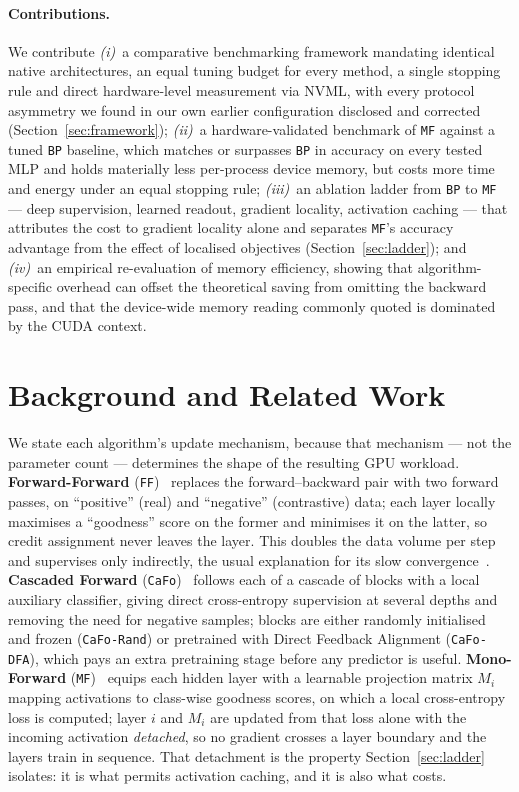 \documentclass{llncs}
\newcommand{\FF}{\texttt{FF}}
\newcommand{\MF}{\texttt{MF}}
\newcommand{\BP}{\texttt{BP}}
\newcommand{\CaFo}{\texttt{CaFo}}
\newcommand{\CaFoRand}{\texttt{CaFo-Rand}}
\newcommand{\CaFoDFA}{\texttt{CaFo-DFA}}
\begin{document}
\paragraph{Contributions.}
We contribute \emph{(i)}~a comparative benchmarking framework mandating
identical native architectures, an equal tuning budget for every method, a
single stopping rule and direct hardware-level measurement via NVML, with
every protocol asymmetry we found in our own earlier configuration disclosed
and corrected (Section~\ref{sec:framework}); \emph{(ii)}~a hardware-validated
benchmark of \MF{} against a tuned \BP{} baseline, which matches or surpasses
\BP{} in accuracy on every tested MLP and holds materially less per-process
device memory, but costs more time and energy under an equal stopping rule;
\emph{(iii)}~an ablation ladder from \BP{} to \MF{} --- deep supervision,
learned readout, gradient locality, activation caching --- that attributes the
cost to gradient locality alone and separates \MF{}'s accuracy advantage from
the effect of localised objectives (Section~\ref{sec:ladder}); and
\emph{(iv)}~an empirical re-evaluation of memory efficiency, showing that
algorithm-specific overhead can offset the theoretical saving from omitting
the backward pass, and that the device-wide memory reading commonly quoted is
dominated by the CUDA context.

\section{Background and Related Work}
\label{sec:algorithms}

We state each algorithm's update mechanism, because that mechanism --- not the
parameter count --- determines the shape of the resulting GPU workload.
\textbf{Forward-Forward} (\FF{})~\cite{hinton2022forward} replaces the
forward--backward pair with two forward passes, on ``positive'' (real) and
``negative'' (contrastive) data; each layer locally maximises a ``goodness''
score on the former and minimises it on the latter, so credit assignment never
leaves the layer. This doubles the data volume per step and supervises only
indirectly, the usual explanation for its slow
convergence~\cite{hinton2022forward,zhao2023cafo}. \textbf{Cascaded Forward}
(\CaFo{})~\cite{zhao2023cafo} follows each of a cascade of blocks with a local
auxiliary classifier, giving direct cross-entropy supervision at several
depths and removing the need for negative samples; blocks are either randomly
initialised and frozen (\CaFoRand{}) or pretrained with Direct Feedback
Alignment (\CaFoDFA{}), which pays an extra pretraining stage before any
predictor is useful. \textbf{Mono-Forward} (\MF{})~\cite{gong2025mono} equips
each hidden layer with a learnable projection matrix $M_i$ mapping activations
to class-wise goodness scores, on which a local cross-entropy loss is
computed; layer $i$ and $M_i$ are updated from that loss alone with the
incoming activation \emph{detached}, so no gradient crosses a layer boundary
and the layers train in sequence. That detachment is the property
Section~\ref{sec:ladder} isolates: it is what permits activation caching, and
it is also what costs.
\end{document}
